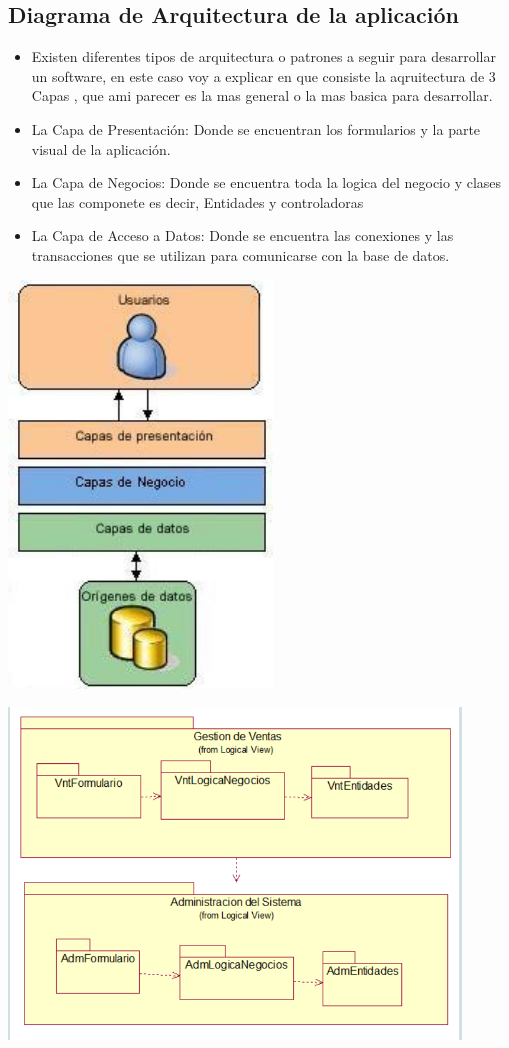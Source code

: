 \documentclass[preprint,12pt]{elsarticle}
\begin{document}
\subsection{\textbf{ Diagrama de Arquitectura de la aplicación }}

\begin{itemize}

\item Existen diferentes tipos de arquitectura o patrones a seguir para desarrollar un software, en este caso voy a explicar en que consiste la aqruitectura de 3 Capas , que ami parecer es la mas general o la mas basica para desarrollar.
\item La Capa de Presentación: Donde se encuentran los formularios y la parte visual de la aplicación.
\item	La Capa de Negocios: Donde se encuentra toda la logica del negocio y clases que las componete es decir, Entidades y controladoras
\item	La Capa de Acceso a Datos: Donde se encuentra las conexiones y las transacciones que se utilizan para comunicarse con la base de datos.
\end{itemize}
\begin{center}
\includegraphics[width=7cm]{./imagen/capas} 
\end{center}
\includegraphics[width=12cm]{./imagen/vistalogica}
\end{document}
